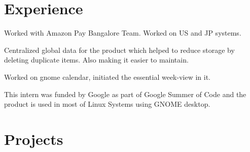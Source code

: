 \documentclass[letterpaper]{deedy-resume} %
\begin{document}
\hfill
%
%
\begin{minipage}[t]{0.66\textwidth} %


\section{Experience}


\vspace{\topsep} %
\begin{tightitemize}
\item Worked with Amazon Pay Bangalore Team. Worked on US and JP systems.
\item Centralized global data for the product which helped to reduce storage by deleting duplicate items. Also making it easier to maintain.
\end{tightitemize}

\sectionspace %



\begin{tightitemize}
\item Worked on gnome calendar, initiated the essential week-view in it.
\item This intern was funded by Google as part of Google Summer of Code and the product is used in most of Linux Systems using GNOME desktop.
\end{tightitemize}

\sectionspace %


\section{Projects}


\end{minipage}
\end{document}
